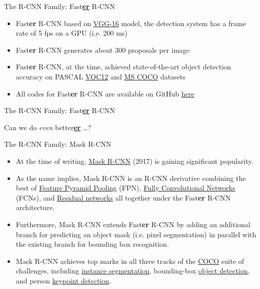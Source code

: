 \documentclass[handout]{beamer}
\begin{document}
\begin{frame}{The R-CNN Family: Fast\underline{\textbf{er}} R-CNN}
\begin{itemize}
\itemsep 1em
	\item<1->Fast\textbf{er} R-CNN based on \href{https://arxiv.org/abs/1409.1556}{\color{blue}VGG-16} model, the detection system has a frame rate of 5 fps on a GPU (i.e. 200 ms)
	\item<2->Fast\textbf{er} R-CNN generates about 300 proposals per image
	\item<3->Fast\textbf{er} R-CNN, at the time, achieved state-of-the-art object detection accuracy on PASCAL \href{http://host.robots.ox.ac.uk/pascal/VOC/voc2012/}{\color{blue}VOC12} and \href{http://mscoco.org}{\color{blue}MS COCO} datasets
	\item<4->All codes for Fast\textbf{er} R-CNN are available on GitHub \href{https://github.com/rbgirshick/py-faster-rcnn}{\color{blue}here}

\end{itemize}
\end{frame}

\begin{frame}{The R-CNN Family: Fast\underline{\textbf{er}} R-CNN}
\begin{centering}
Can we do \emph{even} better\underline{\textbf{er}} \ldots?
\end{centering}
\end{frame}

\begin{frame}{The R-CNN Family: Mask R-CNN}
\begin{itemize}
\itemsep 1em
	\item<1->At the time of writing, \href{}{\color{blue}Mask R-CNN} (2017) is gaining significant popularity. 
	\item<2->As the name implies, Mask R-CNN is an R-CNN derivative combining the best of \href{https://arxiv.org/abs/1612.03144}{\color{blue}Feature Pyramid Pooling} (FPN), \href{https://arxiv.org/abs/1411.4038}{\color{blue}Fully Convolutional Networks} (FCNs), and \href{https://arxiv.org/abs/1512.03385}{\color{blue}Residual networks} all together under the Fast\textbf{er} R-CNN architecture.
	\item<3->Furthermore, Mask R-CNN extends Fast\textbf{er} R-CNN by adding an additional branch for predicting an object mask (i.e. pixel segmentation) in parallel with the existing branch for bounding box recognition.  
	\item<4->Mask R-CNN achieves top marks in all three tracks of the \href{http://mscoco.org}{\color{blue}COCO} suite of challenges, including \href{http://mscoco.org/dataset/\#detections-challenge2016}{\color{blue}instance segmentation}, bounding-box \href{http://mscoco.org/dataset/\#detections-challenge2016}{\color{blue}object detection}, and person \href{http://mscoco.org/dataset/\#keypoints-challenge2016}{\color{blue}keypoint detection}.  
\end{itemize}
\end{frame}
\end{document}
